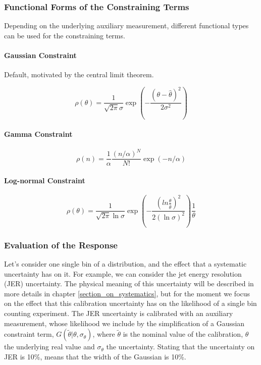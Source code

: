 \subsubsection*{Functional Forms of the Constraining Terms}

Depending on the underlying auxiliary measurement, different functional types can be used for the constraining terms.

\paragraph{Gaussian Constraint}

Default, motivated by the central limit theorem.

\begin{equation}
\label{eq:stat:gauss}
\rho( \theta) = \frac{1}{\sqrt{2\pi}\sigma}\exp\left( -\frac{(\theta - \hat{\theta})^2}{2\sigma^2} \right)
\end{equation}

\paragraph{Gamma Constraint}

\begin{equation}
\label{eq:stat:poisson}
\rho(n) = \frac{1}{\alpha} \frac{(n/\alpha)^N}{N!} \exp\left( -n/\alpha \right)
\end{equation}

\paragraph{Log-normal Constraint}

\begin{equation}
\label{eq:stat:lognorm}
\rho( \theta) = \frac{1}{\sqrt{2\pi}\ln{\sigma}}\exp\left( -\frac{(ln{\frac{\theta}{\hat{\theta}}})^2}{2(\ln{\sigma})^2} \right)\frac{1}{\theta}
\end{equation}


\subsubsection*{Evaluation of the Response}

Let’s consider one single bin of a distribution, and the effect that a systematic uncertainty has on it. For example, we can consider the jet energy resolution (JER) uncertainty. The physical meaning of this uncertainty will be described in more details in chapter \ref{section_on_systematics}, but for the moment we focus on the effect that this calibration uncertainty has on the likelihood of a single bin counting experiment. The JER uncertainty is calibrated with an auxiliary measurement, whose likelihood we include by the simplification of a Gaussian constraint term, $G( \tilde{\theta} | \theta, \sigma_\theta)$, where $\tilde{\theta}$ is the nominal value of the calibration, $\theta$ the underlying real value and $\sigma_\theta$ the uncertainty. Stating that the uncertainty on JER is 10\%, means that the width of the Gaussian is 10\%. 

